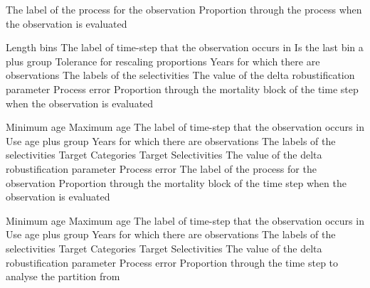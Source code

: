  {The label of the process for the observation}
 {Proportion through the process when the observation is evaluated}
\par\textbf{}\par
{} {Length bins}
 {The label of time-step that the observation occurs in}
 {Is the last bin a plus group}
 {Tolerance for rescaling proportions}
 {Years for which there are observations}
 {The labels of the selectivities}
 {The value of the delta robustification parameter}
 {Process error}
 {Proportion through the mortality block of the time step when the observation is evaluated}
\par\textbf{}\par
{} {Minimum age}
 {Maximum age}
 {The label of time-step that the observation occurs in}
 {Use age plus group}
 {Years for which there are observations}
 {The labels of the selectivities}
 {Target Categories}
 {Target Selectivities}
 {The value of the delta robustification parameter}
 {Process error}
 {The label of the process for the observation}
 {Proportion through the mortality block of the time step when the observation is evaluated}
\par\textbf{}\par
{} {Minimum age}
 {Maximum age}
 {The label of time-step that the observation occurs in}
 {Use age plus group}
 {Years for which there are observations}
 {The labels of the selectivities}
 {Target Categories}
 {Target Selectivities}
 {The value of the delta robustification parameter}
 {Process error}
 {Proportion through the time step to analyse the partition from}
\par\textbf{}\par
